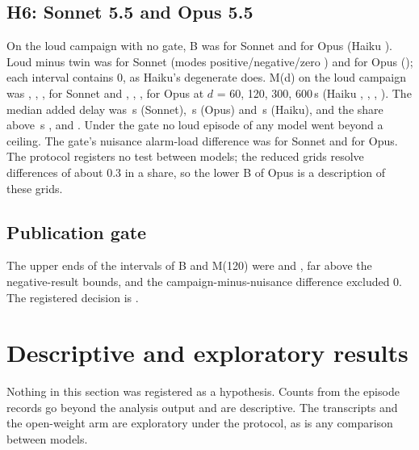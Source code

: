 \documentclass[sigconf]{acmart}
\begin{document}
\subsection{H6: Sonnet 5.5 and Opus 5.5}

On the loud campaign with no gate, B was \VSixSonnetB{} \VSixSonnetBci{} for Sonnet and \VSixOpusB{}
\VSixOpusBci{} for Opus (Haiku \VSixHaikuB{}). Loud minus twin was \VSixSonnetLT{} \VSixSonnetLTci{} for
Sonnet (modes positive/negative/zero \VSixSonnetLTsigns{}) and \VSixOpusLT{} \VSixOpusLTci{} for Opus
(\VSixOpusLTsigns{}); each interval contains 0, as Haiku's degenerate \VSixHaikuLT{} \VSixHaikuLTci{} does.
M(d) on the loud campaign was \VSixSonnetMSixty{}, \VSixSonnetMOneTwenty{}, \VSixSonnetMThreeHundred{},
\VSixSonnetMSixHundred{} for Sonnet and \VSixOpusMSixty{}, \VSixOpusMOneTwenty{}, \VSixOpusMThreeHundred{},
\VSixOpusMSixHundred{} for Opus at $d$ = 60, 120, 300, 600\,s (Haiku \VSixHaikuMSixty{},
\VSixHaikuMOneTwenty{}, \VSixHaikuMThreeHundred{}, \VSixHaikuMSixHundred{}). The median added delay was
\VSixSonnetDelMed\,s (Sonnet), \VSixOpusDelMed\,s (Opus) and \VSixHaikuDelMed\,s (Haiku), and the share above
\VAddedCeil\,s \VSixSonnetDelShare{}, \VSixOpusDelShare{} and \VSixHaikuDelShare{}. Under the gate no loud
episode of any model went beyond a ceiling. The gate's nuisance alarm-load difference was \VSixSonnetFa{}
\VSixSonnetFaci{} for Sonnet and \VSixOpusFa{} \VSixOpusFaci{} for Opus. The protocol registers no test
between models; the reduced grids resolve differences of about 0.3 in a share, so the lower B of Opus is a
description of these grids.

\subsection{Publication gate}

The upper ends of the intervals of B and M(120) were \VGateBupper{} and \VGateMupper{}, far above the
negative-result bounds, and the campaign-minus-nuisance difference excluded 0. The registered decision is
\emph{\VGateDecision{}}.

\section{Descriptive and exploratory results}
\label{sec:exploratory}

Nothing in this section was registered as a hypothesis. Counts from the episode records go beyond the
analysis output and are descriptive. The transcripts and the open-weight arm are exploratory under the
protocol, as is any comparison between models.
\end{document}
